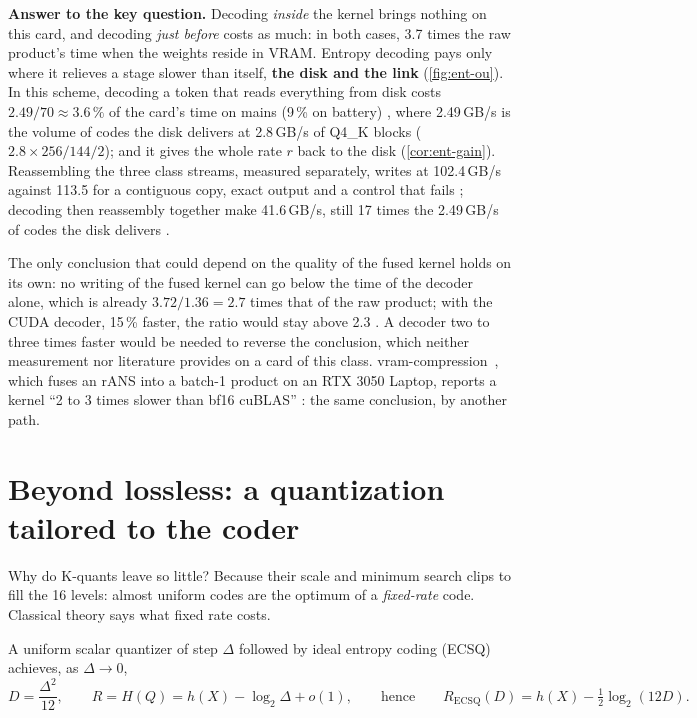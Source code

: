 \textbf{Answer to the key question.} Decoding \emph{inside} the kernel brings nothing on this card, and decoding \emph{just before} costs as much: in both cases, 3.7 times the raw product's time when the weights reside in VRAM. Entropy decoding pays only where it relieves a stage slower than itself, \textbf{the disk and the link} (\cref{fig:ent-ou}). In this scheme, decoding a token that reads everything from disk costs $2.49/70 \approx 3.6\,\%$ of the card's time on mains (9\,\% on battery) \calc, where 2.49\,GB/s is the volume of codes the disk delivers at 2.8\,GB/s of Q4\_K blocks ($2.8 \times 256/144/2$); and it gives the whole rate $r$ back to the disk (\cref{cor:ent-gain}). Reassembling the three class streams, measured separately, writes at 102.4\,GB/s against 113.5 for a contiguous copy, exact output and a control that fails \mes; decoding then reassembly together make 41.6\,GB/s, still 17 times the 2.49\,GB/s of codes the disk delivers \calc.

The only conclusion that could depend on the quality of the fused kernel holds on its own: no writing of the fused kernel can go below the time of the decoder alone, which is already $3.72/1.36 = 2.7$ times that of the raw product; with the CUDA decoder, 15\,\% faster, the ratio would stay above 2.3 \calc. A decoder two to three times faster would be needed to reverse the conclusion, which neither measurement nor literature provides on a card of this class. vram-compression~\cite{nuri2026vramcompression}, which fuses an rANS into a batch-1 product on an RTX 3050 Laptop, reports a kernel ``2 to 3 times slower than bf16 cuBLAS'' \litt: the same conclusion, by another path.

\section{Beyond lossless: a quantization tailored to the coder}\label{sec:ent-ecsq}

Why do K-quants leave so little? Because their scale and minimum search clips to fill the 16 levels: almost uniform codes are the optimum of a \emph{fixed-rate} code. Classical theory says what fixed rate costs.

\begin{theoreme}\label{thm:gish-pierce}
A uniform scalar quantizer of step $\Delta$ followed by ideal entropy coding (ECSQ) achieves, as $\Delta \to 0$,
\begin{equation}\label{eq:gish-pierce}
D = \frac{\Delta^2}{12}, \qquad R = H(Q) = h(X) - \log_2 \Delta + o(1), \qquad\text{hence}\qquad R_{\mathrm{ECSQ}}(D) = h(X) - \tfrac12 \log_2 (12 D).
\end{equation}
\end{theoreme}

